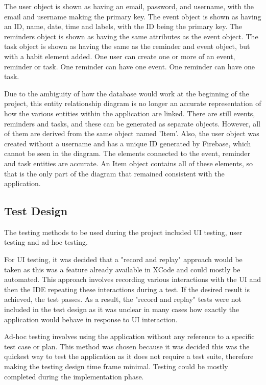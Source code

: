         The user object is shown as having an email, password, and username, with the email and username making the primary key.  The event object is shown as having an ID, name, date, time and labels, with the ID being the primary key.  The reminders object is shown as having the same attributes as the event object.  The task object is shown as having the same as the reminder and event object, but with a habit element added.  One user can create one or more of an event, reminder or task. One reminder can have one event.  One reminder can have one task.
        
        Due to the ambiguity of how the database would work at the beginning of the project, this entity relationship diagram is no longer an accurate representation of how the various entities within the application are linked.  There are still events, reminders and tasks, and these can be generated as separate objects. However, all of them are derived from the same object named 'Item'.  Also, the user object was created without a username and has a unique ID generated by Firebase, which cannot be seen in the diagram.  The elements connected to the event, reminder and task entities are accurate.  An Item object contains all of these elements, so that is the only part of the diagram that remained consistent with the application.
        
        \subsection{Test Design}
        \label{subsec:test_design}
        The testing methods to be used during the project included UI testing, user testing and ad-hoc testing.
        
        For UI testing, it was decided that a "record and replay" approach would be taken as this was a feature already available in XCode and could mostly be automated.  This approach involves recording various interactions with the UI and then the IDE repeating these interactions during a test.  If the desired result is achieved, the test passes.  As a result, the "record and replay" tests were not included in the test design as it was unclear in many cases how exactly the application would behave in response to UI interaction.
        
        Ad-hoc testing involves using the application without any reference to a specific test case or plan\cite{software_testing}. This method was chosen because it was decided this was the quickest way to test the application as it does not require a test suite, therefore making the testing design time frame minimal. Testing could be mostly completed during the implementation phase.
        \vspace{\baselineskip}
        
